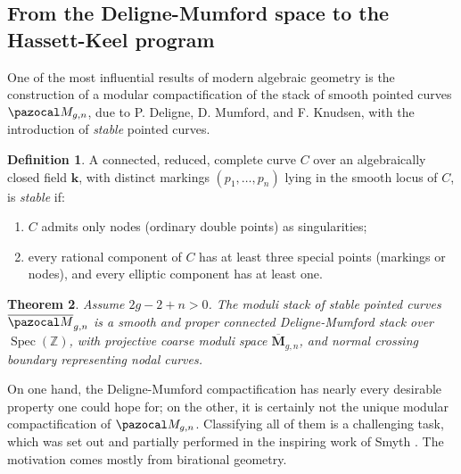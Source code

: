 \documentclass{compositio}
\renewcommand{\k}{\mathbf k}
\newcommand{\oM}{\overline{\pazocal M}}
\theoremstyle{plain}
\newtheorem{thm}{Theorem}[section]
\theoremstyle{definition}
\newtheorem{definition}[thm]{Definition}
\theoremstyle{remark}
\begin{document}
\subsection{From the Deligne-Mumford space to the Hassett-Keel program} One of the most influential results of modern algebraic geometry is the construction of a modular compactification of the stack of smooth pointed curves $\pazocal M_{g,n}$, due to P. Deligne, D. Mumford, and F. Knudsen, with the introduction of \emph{stable} pointed curves.

\begin{definition}\cite{DM}
 A connected, reduced, complete curve $C$ over an algebraically closed field $\k$, with distinct markings $(p_1,\ldots,p_n)$ lying in the smooth locus of $C$, is \emph{stable} if:
 \begin{enumerate}[leftmargin=.7cm]
  \item $C$ admits only nodes (ordinary double points) as singularities;
  \item every rational component of $C$ has at least three special points (markings or nodes), and every elliptic component has at least one.
 \end{enumerate}
\end{definition}

\begin{thm} \cite{DM,Knudsen}
 Assume $2g-2+n>0$. The moduli stack of stable pointed curves $\oM_{g,n}$ is a smooth and proper connected Deligne-Mumford stack over $\operatorname{Spec}(\mathbb Z)$, with projective coarse moduli space $\overline{\mathbf M}_{g,n}$, and normal crossing boundary representing nodal curves.
\end{thm}
On one hand, the Deligne-Mumford compactification has nearly every desirable property one could hope for; on the other, it is certainly not the unique modular compactification of $\pazocal M_{g,n}$. Classifying all of them is a challenging task, which was set out and partially performed in the inspiring work of Smyth \cite{SMY-towards}. The motivation comes mostly from birational geometry.
\end{document}
